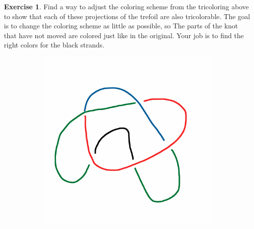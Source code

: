 \documentclass[12pt,letterpaper]{article}
\theoremstyle{definition}
\newtheorem{exercise}[question]{Exercise}
\begin{document}
\begin{exercise}
Find a way to adjust the coloring scheme from the tricoloring above to show that each of these projections of the trefoil are also tricolorable.
The goal is to change the coloring scheme as little as possible, so 
The parts of the knot that have not moved are colored just like in the original.
Your job is to find the right colors for the black strands.
\end{exercise}

\begin{figure}[h] 
    \centering
    \begin{subfigure}{.3\textwidth}
        \centering
        \includegraphics[width=\textwidth]{knotpics/tricolor2.png}
    \end{subfigure}
    \quad
    \begin{subfigure}{.3\textwidth}
        \centering

\end{subfigure}
\end{figure}
\end{document}
